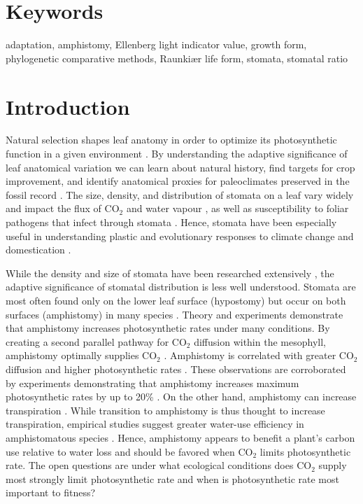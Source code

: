 \documentclass[12pt, oneside]{article}
\begin{document}
\section*{Keywords}

adaptation, amphistomy, Ellenberg light indicator value, growth form, phylogenetic comparative methods, Raunki\ae r life form, stomata, stomatal ratio

\clearpage

\section*{Introduction}

Natural selection shapes leaf anatomy in order to optimize its photosynthetic function in a given environment \citep{Haberlandt_1914, Givnish_1987, Smith_etal_1997}. By understanding the adaptive significance of leaf anatomical variation we can learn about natural history, find targets for crop improvement, and identify anatomical proxies for paleoclimates preserved in the fossil record \citep[e.g.][]{Wolfe_1971, Royer_2001, McElwain_Steinthorsdottir_2017}. The size, density, and distribution of stomata on a leaf vary widely and impact the flux of CO$_2$ and water vapour \citep[recently reviewed in][]{Sack_Buckley_2016}, as well as susceptibility to foliar pathogens that infect through stomata \citep{Mckown_etal_2014, Melotto_etal_2017}. Hence, stomata have been especially useful in understanding plastic and evolutionary responses to climate change and domestication \citep{Woodward_1987, Beerling_Royer_2011, Milla_etal_2013}.

While the density and size of stomata have been researched extensively \citep[and references therein]{Sack_Buckley_2016}, the adaptive significance of stomatal distribution is less well understood. Stomata are most often found only on the lower leaf surface (hypostomy) but occur on both surfaces (amphistomy) in many species \citep{Metcalfe_Chalk_1950, Parkhurst_1978, Mott_etal_1982}. Theory and experiments demonstrate that amphistomy increases photosynthetic rates under many conditions. By creating a second parallel pathway for CO$_2$ diffusion within the mesophyll, amphistomy optimally supplies CO$_2$ \citep{Parkhurst_1978, Gutschick_1984b, Jones_1985}. Amphistomy is correlated with greater CO$_2$ diffusion \citep{Beerling_Kelly_1996} and higher photosynthetic rates \citep{Mckown_etal_2014}. These observations are corroborated by experiments demonstrating that amphistomy increases maximum photosynthetic rates by up to 20\% \citep{Parkhurst_Mott_1990}. On the other hand, amphistomy can increase transpiration \citep{Jones_1985, Foster_Smith_1986, Buckley_etal_2015}. While transition to amphistomy is thus thought to increase transpiration, empirical studies suggest greater water-use efficiency in amphistomatous species \citep{Bucher_etal_2017}. Hence, amphistomy appears to benefit a plant's carbon use relative to water loss and should be favored when CO$_2$ limits photosynthetic rate. The open questions are under what ecological conditions does CO$_2$ supply most strongly limit photosynthetic rate \citep{Peat_Fitter_1994b} and when is photosynthetic rate most important to fitness?
\end{document}

